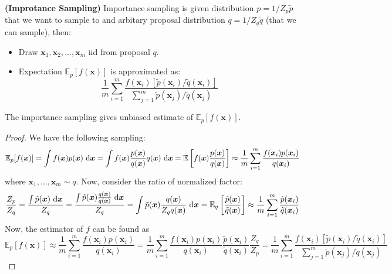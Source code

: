 \begin{definition}{\textbf{(Improtance Sampling)}}
    Importance sampling is given distribution $p = 1/Z_p \tilde{p}$ that we want to sample to and arbitary proposal distribution $q = 1/Z_q \tilde{q}$ (that we can sample), then:
    \begin{itemize}
        \item Draw $\boldsymbol x_1,\boldsymbol x_2,\dots,\boldsymbol x_m$ iid from proposal $q$. 
        \item Expectation $\mathbb{E}_p[f(\boldsymbol x)]$ is approximated as:
        \begin{equation*}
            \frac{1}{m}\sum^m_{i=1}\frac{f(\boldsymbol x_i)[\tilde{p}(\boldsymbol x_i)/\tilde{q}(\boldsymbol x_i)]}{\sum^m_{j=1}\tilde{p}(\boldsymbol x_j)/\tilde{q}(\boldsymbol x_j)}
        \end{equation*}
    \end{itemize}
\end{definition}

\begin{proposition}
    The importance sampling gives unbiased estimate of $\mathbb{E}_p[f(\boldsymbol x)]$. 
\end{proposition}
\begin{proof}
    We have the following sampling:
    \begin{equation*}
        \mathbb{E}_p[f(\boldsymbol x)] = \int f(\boldsymbol x)p(\boldsymbol x)\ \mathrm{d} \boldsymbol x = \int f(\boldsymbol x)\frac{p(\boldsymbol x)}{q(\boldsymbol x)}q(\boldsymbol x)\ \mathrm{d} \boldsymbol x = \mathbb{E}\left[  f(\boldsymbol x)\frac{p(\boldsymbol x)}{q(\boldsymbol x)}  \right] \approx \frac{1}{m}\sum^m_{i=1}\frac{f(\boldsymbol x_i)p(\boldsymbol x_i)}{q(\boldsymbol x_i)}
    \end{equation*}
    where $\boldsymbol x_1,\dots,\boldsymbol x_m \sim q$. Now, consider the ratio of normalized factor:
    \begin{equation*}
        \frac{Z_p}{Z_q} = \frac{\int \tilde{p}(\boldsymbol x)\ \mathrm{d}\boldsymbol x}{Z_q} = \frac{\int \tilde{p}(\boldsymbol x)\frac{q(\boldsymbol x)}{q(\boldsymbol x)}\ \mathrm{d}\boldsymbol x}{Z_q} = \int \tilde{p}(\boldsymbol x)\frac{q(\boldsymbol x)}{Z_qq(\boldsymbol x)}\ \mathrm{d} \boldsymbol x = \mathbb{E}_q \left[ \frac{\tilde{p}(\boldsymbol x)}{\tilde{q}(\boldsymbol x)} \right] \approx \frac{1}{m}\sum^m_{i=1}\frac{\tilde{p}(\boldsymbol x_i)}{\tilde{q}(\boldsymbol x_i)}
    \end{equation*}
    Now, the estimator of $f$ can be found as 
    \begin{equation*} 
        \mathbb{E}_p[f(\boldsymbol x)] \approx \frac{1}{m}\sum^m_{i=1}\frac{f(\boldsymbol x_i)p(\boldsymbol x_i)}{q(\boldsymbol x_i)} = \frac{1}{m}\sum^m_{i=1}\frac{f(\boldsymbol x_i)p(\boldsymbol x_i)}{q(\boldsymbol x_i)}\frac{\tilde{p}(\boldsymbol x_i)}{\tilde{q}(\boldsymbol x_i)}\frac{Z_q}{Z_p} = \frac{1}{m}\sum^m_{i=1}\frac{f(\boldsymbol x_i)[\tilde{p}(\boldsymbol x_i)/\tilde{q}(\boldsymbol x_i)]}{\sum^m_{j=1}\tilde{p}(\boldsymbol x_j)/\tilde{q}(\boldsymbol x_j)}
    \end{equation*}
\end{proof}

